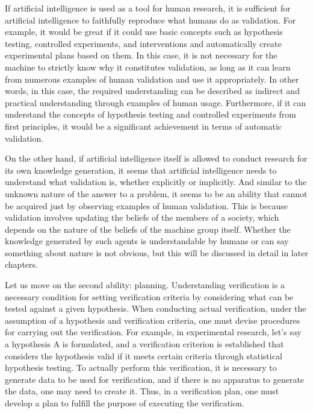 \documentclass{book}
\begin{document}
If artificial intelligence is used as a tool for human research, it is sufficient for artificial intelligence to faithfully reproduce what humans do as validation. For example, it would be great if it could use basic concepts such as hypothesis testing, controlled experiments, and interventions and automatically create experimental plans based on them. In this case, it is not necessary for the machine to strictly know why it constitutes validation, as long as it can learn from numerous examples of human validation and use it appropriately. In other words, in this case, the required understanding can be described as indirect and practical understanding through examples of human usage. Furthermore, if it can understand the concepts of hypothesis testing and controlled experiments from first principles, it would be a significant achievement in terms of automatic validation.

On the other hand, if artificial intelligence itself is allowed to conduct research for its own knowledge generation, it seems that artificial intelligence needs to understand what validation is, whether explicitly or implicitly. And similar to the unknown nature of the answer to a problem, it seems to be an ability that cannot be acquired just by observing examples of human validation. This is because validation involves updating the beliefs of the members of a society, which depends on the nature of the beliefs of the machine group itself. Whether the knowledge generated by such agents is understandable by humans or can say something about nature is not obvious, but this will be discussed in detail in later chapters.

Let us move on the second ability: planning. Understanding verification is a necessary condition for setting verification criteria by considering what can be tested against a given hypothesis. When conducting actual verification, under the assumption of a hypothesis and verification criteria, one must devise procedures for carrying out the verification. For example, in experimental research, let's say a hypothesis A is formulated, and a verification criterion is established that considers the hypothesis valid if it meets certain criteria through statistical hypothesis testing. To actually perform this verification, it is necessary to generate data to be used for verification, and if there is no apparatus to generate the data, one may need to create it. Thus, in a verification plan, one must develop a plan to fulfill the purpose of executing the verification.
\end{document}
